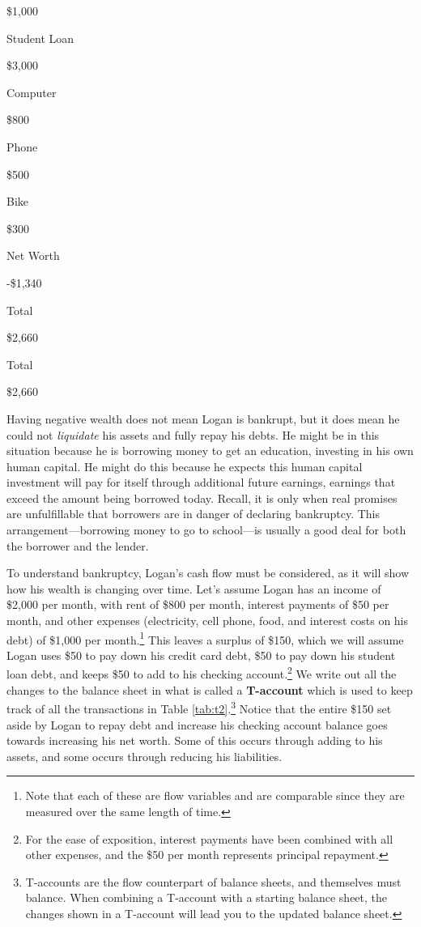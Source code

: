 \documentclass[
]{book}
\begin{document}
\$1,000

Student Loan

\$3,000

Computer

\$800

Phone

\$500

Bike

\$300

Net Worth

-\$1,340

Total

\$2,660

Total

\$2,660

Having negative wealth does not mean Logan is bankrupt, but it does mean he could not \emph{liquidate} his assets and fully repay his debts. He might be in this situation because he is borrowing money to get an education, investing in his own human capital. He might do this because he expects this human capital investment will pay for itself through additional future earnings, earnings that exceed the amount being borrowed today. Recall, it is only when real promises are unfulfillable that borrowers are in danger of declaring bankruptcy. This arrangement---borrowing money to go to school---is usually a good deal for both the borrower and the lender.

To understand bankruptcy, Logan's cash flow must be considered, as it will show how his wealth is changing over time. Let's assume Logan has an income of \$2,000 per month, with rent of \$800 per month, interest payments of \$50 per month, and other expenses (electricity, cell phone, food, and interest costs on his debt) of \$1,000 per month.\footnote{Note that each of these are flow variables and are comparable since they are measured over the same length of time.} This leaves a surplus of \$150, which we will assume Logan uses \$50 to pay down his credit card debt, \$50 to pay down his student loan debt, and keeps \$50 to add to his checking account.\footnote{For the ease of exposition, interest payments have been combined with all other expenses, and the \$50 per month represents principal repayment.} We write out all the changes to the balance sheet in what is called a \textbf{T-account} which is used to keep track of all the transactions in Table \ref{tab:t2}.\footnote{T-accounts are the flow counterpart of balance sheets, and themselves must balance. When combining a T-account with a starting balance sheet, the changes shown in a T-account will lead you to the updated balance sheet.} Notice that the entire \$150 set aside by Logan to repay debt and increase his checking account balance goes towards increasing his net worth. Some of this occurs through adding to his assets, and some occurs through reducing his liabilities.
\end{document}
